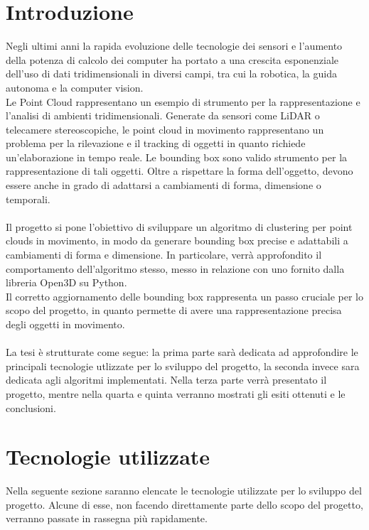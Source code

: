 \documentclass[italian]{report}
\begin{document}
\chapter*{Introduzione}
Negli ultimi anni la rapida evoluzione delle tecnologie dei sensori e l'aumento della potenza di calcolo dei computer ha portato a una crescita esponenziale dell'uso di dati tridimensionali in diversi campi, tra cui la robotica, la  guida autonoma e la computer vision.\\
Le Point Cloud rappresentano un esempio di strumento per la rappresentazione e l'analisi di ambienti tridimensionali. Generate da sensori come LiDAR o telecamere stereoscopiche, le point cloud in movimento rappresentano un problema per la rilevazione e il tracking di oggetti in quanto richiede un'elaborazione in tempo reale. Le bounding box sono valido strumento per la rappresentazione di tali oggetti. Oltre a rispettare la forma dell'oggetto, devono essere anche in grado di adattarsi a cambiamenti di forma, dimensione o temporali.\\
\\
Il progetto si pone l'obiettivo di sviluppare un algoritmo di clustering per point clouds in movimento, in modo da generare bounding box precise e adattabili a cambiamenti di forma e dimensione. In particolare, verrà approfondito il comportamento dell'algoritmo stesso, messo in relazione con uno fornito dalla libreria Open3D su Python.\\
Il corretto aggiornamento delle bounding box rappresenta un passo cruciale per lo scopo del progetto, in quanto permette di avere una rappresentazione precisa degli oggetti in movimento.\\
\\
La tesi è strutturate come segue: la prima parte sarà dedicata ad approfondire le principali tecnologie utlizzate per lo sviluppo del progetto, la seconda invece sara dedicata agli algoritmi implementati. Nella terza parte verrà presentato il progetto, mentre nella quarta e quinta verranno mostrati gli esiti ottenuti e le conclusioni.
\newpage

\chapter{Tecnologie utilizzate}
Nella seguente sezione saranno elencate le tecnologie utilizzate per lo sviluppo del progetto. Alcune di esse, non facendo direttamente parte dello scopo del progetto, verranno passate in rassegna più rapidamente.
\end{document}
